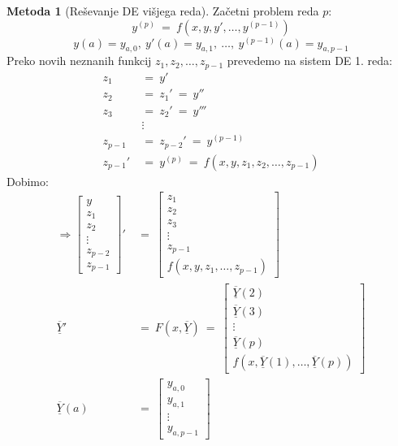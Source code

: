 \documentclass[11pt]{article}
\theoremstyle{definition}
\theoremstyle{definition}
\newtheorem*{metoda}{Metoda}
\begin{document}
\begin{metoda}[Reševanje DE višjega reda]

Začetni problem reda $p$:
$$y^{(p)} ~=~ f(x, y, y', \ldots, y^{(p-1)})$$
$$y(a) = y_{a, 0}, ~y'(a) = y_{a, 1}, ~\ldots, ~y^{(p-1)}(a) = y_{a, p-1}$$
Preko novih neznanih funkcij $z_1, z_2, \ldots, z_{p-1}$ prevedemo na sistem DE 1. reda:
\begin{align*}
z_1 ~&=~ y' \\
z_2 ~&=~ z_1' ~=~ y'' \\
z_3 ~&=~ z_2' ~=~ y''' \\
&\vdots \\
z_{p-1} ~&=~ z_{p-2}' ~=~ y^{(p-1)} \\
z_{p-1}' ~&=~ y^{(p)} ~=~ f(x, y, z_1, z_2, \ldots, z_{p-1})
\end{align*}
Dobimo:
\begin{align*}
\Longrightarrow \begin{bmatrix}
y \\
z_1 \\
z_2 \\
\vdots \\
z_{p-2} \\
z_{p-1}
\end{bmatrix}' ~&=~ \begin{bmatrix}
z_1 \\
z_2 \\
z_3 \\
\vdots \\
z_{p-1} \\
f(x, y, z_1, \ldots, z_{p-1})
\end{bmatrix} \\
\overline{\underline{Y}}' ~&=~ F(x, \overline{\underline{Y}}) ~=~ \begin{bmatrix}
\overline{\underline{Y}}(2) \\
\overline{\underline{Y}}(3) \\
\vdots \\
\overline{\underline{Y}}(p) \\
f(x, \overline{\underline{Y}}(1), \ldots, \overline{\underline{Y}}(p))
\end{bmatrix} \\
\overline{\underline{Y}}(a) ~&=~ \begin{bmatrix}
y_{a, 0} \\
y_{a, 1} \\
\vdots \\
y_{a, p-1}
\end{bmatrix}
\end{align*}

\end{metoda}
\vspace{0.5cm}


\pagebreak

\end{document}
